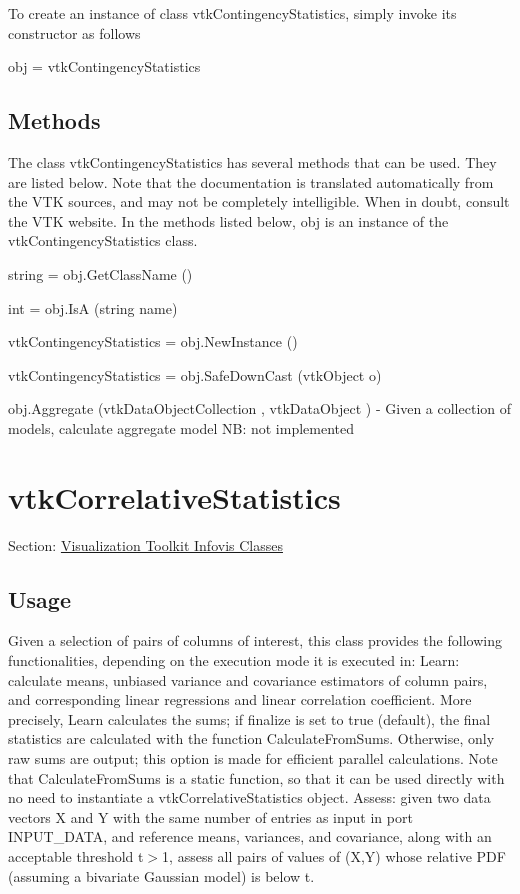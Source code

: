 To create an instance of class vtk\-Contingency\-Statistics, simply invoke its constructor as follows \begin{DoxyVerb}  obj = vtkContingencyStatistics
\end{DoxyVerb}
 \hypertarget{vtkwidgets_vtkxyplotwidget_Methods}{}\subsection{Methods}\label{vtkwidgets_vtkxyplotwidget_Methods}
The class vtk\-Contingency\-Statistics has several methods that can be used. They are listed below. Note that the documentation is translated automatically from the V\-T\-K sources, and may not be completely intelligible. When in doubt, consult the V\-T\-K website. In the methods listed below, {\ttfamily obj} is an instance of the vtk\-Contingency\-Statistics class. 
\begin{DoxyItemize}
\item {\ttfamily string = obj.\-Get\-Class\-Name ()}  
\item {\ttfamily int = obj.\-Is\-A (string name)}  
\item {\ttfamily vtk\-Contingency\-Statistics = obj.\-New\-Instance ()}  
\item {\ttfamily vtk\-Contingency\-Statistics = obj.\-Safe\-Down\-Cast (vtk\-Object o)}  
\item {\ttfamily obj.\-Aggregate (vtk\-Data\-Object\-Collection , vtk\-Data\-Object )} -\/ Given a collection of models, calculate aggregate model N\-B\-: not implemented  
\end{DoxyItemize}\hypertarget{vtkinfovis_vtkcorrelativestatistics}{}\section{vtk\-Correlative\-Statistics}\label{vtkinfovis_vtkcorrelativestatistics}
Section\-: \hyperlink{sec_vtkinfovis}{Visualization Toolkit Infovis Classes} \hypertarget{vtkwidgets_vtkxyplotwidget_Usage}{}\subsection{Usage}\label{vtkwidgets_vtkxyplotwidget_Usage}
Given a selection of pairs of columns of interest, this class provides the following functionalities, depending on the execution mode it is executed in\-: Learn\-: calculate means, unbiased variance and covariance estimators of column pairs, and corresponding linear regressions and linear correlation coefficient. More precisely, Learn calculates the sums; if {\ttfamily finalize} is set to true (default), the final statistics are calculated with the function Calculate\-From\-Sums. Otherwise, only raw sums are output; this option is made for efficient parallel calculations. Note that Calculate\-From\-Sums is a static function, so that it can be used directly with no need to instantiate a vtk\-Correlative\-Statistics object. Assess\-: given two data vectors X and Y with the same number of entries as input in port I\-N\-P\-U\-T\-\_\-\-D\-A\-T\-A, and reference means, variances, and covariance, along with an acceptable threshold t$>$1, assess all pairs of values of (X,Y) whose relative P\-D\-F (assuming a bivariate Gaussian model) is below t.

